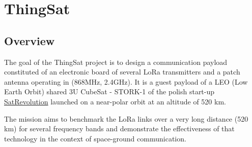 \section{ThingSat}
\label{sec:case-study}

\subsection{Overview}



The goal of the ThingSat project is to design a communication payload
constituted of an electronic board of several LoRa transmitters and a patch
antenna operating in (868MHz, 2.4GHz). It is a guest payload of a LEO (Low Earth
Orbit) shared 3U CubeSat - STORK-1 of the polish start-up
\href{https://www.satrevolution.com/}{SatRevolution} launched on a near-polar
orbit at an altitude of 520 km.


The mission aims to benchmark the LoRa links over a very long distance (520 km)
for several frequency bands and demonstrate the effectiveness of that technology
in the context of space-ground communication.

